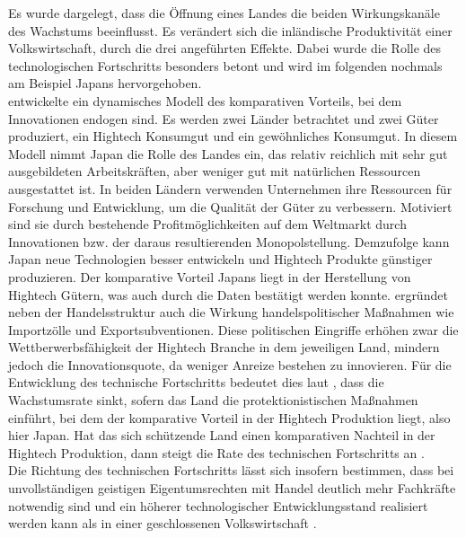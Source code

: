 %
Es wurde dargelegt, dass die Öffnung eines Landes die beiden Wirkungskanäle des Wachstums beeinflusst. Es verändert sich die inländische Produktivität einer Volkswirtschaft, durch die drei angeführten Effekte. Dabei wurde die Rolle des technologischen Fortschritts besonders betont und wird im folgenden nochmals am Beispiel Japans hervorgehoben.\\
\cite{Grossman.1990} entwickelte ein dynamisches Modell des komparativen Vorteils, bei dem Innovationen endogen sind. Es werden zwei Länder betrachtet und zwei Güter produziert, ein Hightech Konsumgut und ein gewöhnliches Konsumgut. In diesem Modell nimmt Japan die Rolle des Landes ein, das relativ reichlich mit sehr gut ausgebildeten Arbeitskräften, aber weniger gut mit natürlichen Ressourcen ausgestattet ist. In beiden Ländern verwenden Unternehmen ihre Ressourcen für Forschung und Entwicklung, um die Qualität der Güter zu verbessern. Motiviert sind sie durch bestehende Profitmöglichkeiten auf dem Weltmarkt durch Innovationen bzw. der daraus resultierenden Monopolstellung. Demzufolge kann Japan neue Technologien besser entwickeln und Hightech Produkte günstiger produzieren.  Der komparative Vorteil Japans liegt in der Herstellung von Hightech Gütern, was auch durch die Daten bestätigt werden konnte. \cite{Grossman.1990} ergründet neben der Handelsstruktur auch die Wirkung handelspolitischer Maßnahmen wie Importzölle und Exportsubventionen. Diese politischen Eingriffe erhöhen zwar die Wettberwerbsfähigkeit der Hightech Branche in dem jeweiligen Land, mindern jedoch die Innovationsquote, da weniger Anreize bestehen zu innovieren. Für die Entwicklung des technische Fortschritts bedeutet dies laut \cite{Grossman.1990}, dass die Wachstumsrate sinkt, sofern das Land die protektionistischen Maßnahmen einführt, bei dem der komparative Vorteil in der Hightech Produktion liegt, also hier Japan. Hat das sich schützende Land einen komparativen Nachteil in der Hightech Produktion, dann steigt die Rate des technischen Fortschritts an \cite[S. 30]{Grossman.1990}.\\
%
Die Richtung des technischen Fortschritts lässt sich insofern bestimmen, dass bei unvollständigen geistigen Eigentumsrechten mit Handel deutlich mehr Fachkräfte notwendig sind und ein höherer technologischer Entwicklungsstand realisiert werden kann als in einer geschlossenen Volkswirtschaft \cite{Acemoglu.2003,Thoenig.2003,Epifani.2006}.
